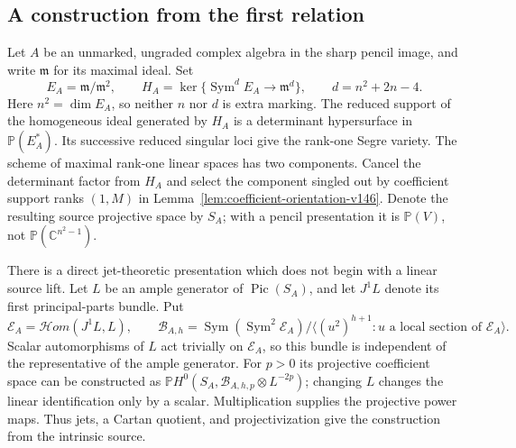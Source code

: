 \documentclass[11pt,reqno]{amsart}
\numberwithin{equation}{section}
\theoremstyle{definition}\newtheorem{definition}[theorem]{Definition}
\theoremstyle{remark}\newtheorem{remark}[theorem]{Remark}
\newcommand{\C}{\mathbb C}\newcommand{\Q}{\mathbb Q}
\newcommand{\Pj}{\mathbb P}\newcommand{\A}{\mathbb A}
\DeclareMathOperator{\Sym}{Sym}\DeclareMathOperator{\Gr}{Gr}
\DeclareMathOperator{\Pic}{Pic}\DeclareMathOperator{\diag}{diag}
\begin{document}
\subsection{A construction from the first relation}
Let $A$ be an unmarked, ungraded complex algebra in the sharp pencil
image, and write $\mathfrak m$ for its maximal ideal. Set
\begin{equation}\label{eq:intrinsic-data-v158}
 E_A=\mathfrak m/\mathfrak m^2,\qquad
 H_A=\ker\{\Sym^dE_A\longrightarrow\mathfrak m^d\},
 \qquad d=n^2+2n-4.
\end{equation}
Here $n^2=\dim E_A$, so neither $n$ nor $d$ is extra marking.
The reduced support of the homogeneous ideal generated by $H_A$ is a
determinant hypersurface in $\Pj(E_A^*)$. Its successive reduced
singular loci give the rank-one Segre variety. The scheme of maximal
rank-one linear spaces has two components. Cancel the determinant
factor from $H_A$ and select the component singled out by coefficient
support ranks $(1,M)$ in Lemma~\ref{lem:coefficient-orientation-v146}.
Denote the resulting source projective space by $S_A$; with a pencil
presentation it is $\Pj(V)$, not $\Pj(\C^{n^2-1})$.

There is a direct jet-theoretic presentation which does not begin with
a linear source lift. Let $L$ be an ample generator of $\Pic(S_A)$,
and let $J^1L$ denote its first principal-parts bundle. Put
\begin{equation}\label{eq:jet-envelope-v158}
 \mathscr E_A=\mathcal Hom(J^1L,L),\qquad
 \mathscr B_{A,h}=
 \Sym(\Sym^2\mathscr E_A)/
     \langle(u^2)^{h+1}:u\text{ a local section of }\mathscr E_A\rangle.
\end{equation}
Scalar automorphisms of $L$ act trivially on $\mathscr E_A$, so this
bundle is independent of the representative of the ample generator.
For $p>0$ its projective coefficient space can be constructed as
$\Pj H^0(S_A,\mathscr B_{A,h,p}\otimes L^{-2p})$; changing $L$
changes the linear identification only by a scalar. Multiplication
supplies the projective power maps. Thus jets, a Cartan quotient, and
projectivization give the construction from the intrinsic source.
\end{document}
